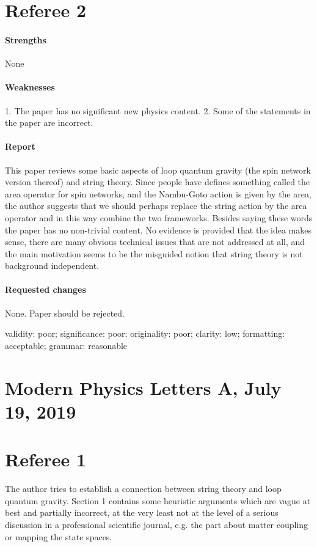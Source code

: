 \documentclass[11pt]{article}
\begin{document}
\section*{Referee 2}

\paragraph{Strengths} None

\paragraph{Weaknesses} 1. The paper has no significant new physics content. 2. Some of the statements in the paper are incorrect.

\paragraph{Report}  This paper reviews some basic aspects of loop quantum gravity (the spin network version thereof) and string theory. Since people have
defines something called the area operator for spin networks, and the Nambu-Goto action is given by the area, the author suggests that we should perhaps replace the string action by the area operator and in this way combine the two frameworks. Besides saying these words the paper has no non-trivial content. No evidence is provided that the idea makes sense, there are many obvious technical issues that are not addressed at all, and the main motivation seems to be the misguided notion that string theory is not background independent.

\paragraph{Requested changes} None. Paper should be rejected.

validity: poor; significance: poor; originality: poor; clarity: low; formatting: acceptable; grammar: reasonable

\section{Modern Physics Letters A, July 19, 2019}

\section*{Referee 1}

The author tries to establish a connection between string theory and loop quantum gravity. Section 1 contains some heuristic arguments which are vague at best and partially incorrect, at the very least not at the level of a serious discussion in a professional scientific journal, e.g. the part about matter coupling or mapping the state spaces.
\end{document}
